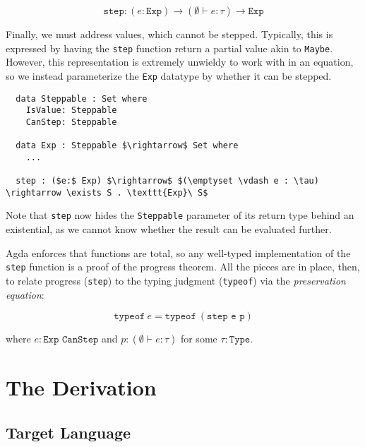 \documentclass[manuscript,screen,review,sigplan]{acmart}
\begin{document}
\begin{equation}
  \texttt{step} : (e: \texttt{Exp}) \rightarrow (\emptyset \vdash e : \tau)
    \rightarrow \texttt{Exp}
\end{equation}

Finally, we must address values, which cannot be stepped. Typically, this is
expressed by having the \texttt{step} function return a partial value akin to
\texttt{Maybe}. However, this representation is extremely unwieldy to work with
in an equation, so we instead parameterize the \texttt{Exp} datatype by whether
it can be stepped.

\begin{lstlisting}
  data Steppable : Set where
    IsValue: Steppable
    CanStep: Steppable

  data Exp : Steppable $\rightarrow$ Set where
    ...

  step : ($e:$ Exp) $\rightarrow$ $(\emptyset \vdash e : \tau) \rightarrow \exists S . \texttt{Exp}\ S$
\end{lstlisting}

Note that \texttt{step} now hides the \texttt{Steppable} parameter of its
return type behind an existential, as we cannot know whether the result can be
evaluated further.

Agda enforces that functions are total, so any well-typed implementation of the
\texttt{step} function is a proof of the progress theorem. All the pieces are
in place, then, to relate progress (\texttt{step}) to the typing judgment
(\texttt{typeof}) via the \emph{preservation equation}:

\begin{equation}
  \texttt{typeof}\ e = \texttt{typeof}\ (\texttt{step e p})
\end{equation}

where $e : \texttt{Exp CanStep}$ and $p : (\emptyset \vdash e : \tau)$ for some
$\tau : \texttt{Type}$.

\section{The Derivation}

\subsection{Target Language}



\end{document}
